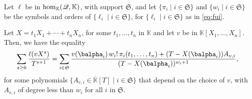 \documentclass[12pt]{article}
\newcommand{\lf}{X}
\newcommand{\residueI}{\mathscr{Q}}
\def\K{\mathbb{K}}
\def\K {\ensuremath{\mathbb{K}}}
\def\Kbar {{\ensuremath{\overline{\mathbb{K}}}}}
\begin{document}
\begin{lemma}\label{lemma:formula}
  Let $\ell$ be in ${\rm hom}_\K(\residueI,\K)$, with support $\mathfrak{S}$,
  and let $\{\pi_i \mid i \in \mathfrak{S}\}$ and $\{w_i \mid i \in
  \mathfrak{S}\}$ be the symbols and orders of $\{\ell_i \mid i \in \mathfrak{S}\}$,
  for $\{\ell_i \mid i \in \mathfrak{S}\}$ as in \cref{eq:fui}.
	
  Let $\lf=t_1 X_1 + \cdots +t_n X_n$, for some $t_1,\dots,t_n$ in $\K$
  and let $v$ be in $\K[X_1,\dots,X_n]$. Then, we have the equality
  \begin{align}\label{eq:sumgenseries}
    \sum_{s \ge 0} \frac{\ell(v \lf^s)}{T^{s+1}} = \sum_{i \in \mathfrak{S}}
    \frac{ v(\balpha_i)\, w_i!\, \pi_{i}(t_1,\dots,t_n) +
      (T-\lf(\balpha_i))A_{v,i}} {(T-\lf(\balpha_i))^{w_{i}+1}},
  \end{align}
  for some polynomials $\{A_{v,i} \in \Kbar[T] \mid i \in \mathfrak{S}\}$ that
  depend on the choice of $v$, with $A_{v,i}$ of degree less than $w_i$ for all $i$ in
  $\mathfrak{S}$.
\end{lemma}
\end{document}
